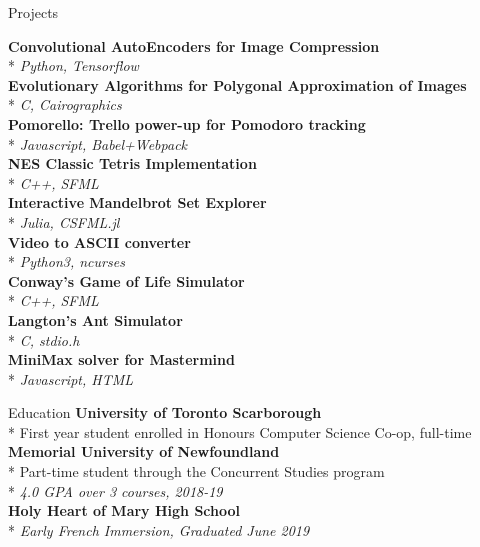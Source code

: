\documentclass[11pt, letterpaper]{article}
\begin{document}
\begin{section}{Projects}

\begin{multicols}{2}
\textbf{Convolutional AutoEncoders for Image Compression}\\*
\textit{Python, Tensorflow}\\

\textbf{Evolutionary Algorithms for Polygonal Approximation of Images}\\*
\textit{C, Cairographics}\\

\textbf{Pomorello: Trello power-up for Pomodoro tracking}\\*
\textit{Javascript, Babel+Webpack}\\

\textbf{NES Classic Tetris Implementation}\\*
\textit{C++, SFML}\\

\textbf{Interactive Mandelbrot Set Explorer}\\*
\textit{Julia, CSFML.jl}\\

\textbf{Video to ASCII converter}\\*
\textit{Python3, ncurses}\\

\textbf{Conway's Game of Life Simulator}\\*
\textit{C++, SFML}\\

\textbf{Langton's Ant Simulator}\\*
\textit{C, stdio.h}\\

\textbf{MiniMax solver for Mastermind}\\*
\textit{Javascript, HTML}
\end{multicols}

\end{section}

\begin{section}{Education}
\textbf{University of Toronto Scarborough}\\*
First year student enrolled in Honours Computer Science Co-op, full-time\\

\textbf{Memorial University of Newfoundland}\\*
Part-time student through the Concurrent Studies program\\*
\textit{4.0 GPA over 3 courses, 2018-19}\\

\textbf{Holy Heart of Mary High School}\\*
\textit{Early French Immersion, Graduated June 2019}
\end{section}
\end{document}
